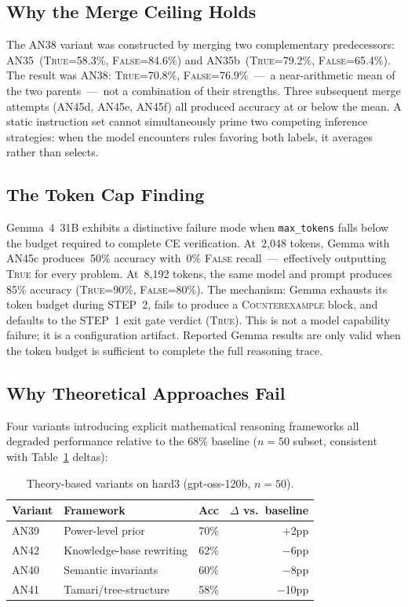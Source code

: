\documentclass[11pt]{article}
\begin{document}
\subsection{Why the Merge Ceiling Holds}

The AN38 variant was constructed by merging two complementary
predecessors: AN35~(\textsc{True}=58.3\%, \textsc{False}=84.6\%) and
AN35b~(\textsc{True}=79.2\%, \textsc{False}=65.4\%). The result was
AN38: \textsc{True}=70.8\%, \textsc{False}=76.9\%~---~a near-arithmetic
mean of the two parents~---~not a combination of their strengths. Three
subsequent merge attempts (AN45d, AN45e, AN45f) all produced accuracy
at or below the mean. A static instruction set cannot simultaneously
prime two competing inference strategies: when the model encounters
rules favoring both labels, it averages rather than selects.

\subsection{The Token Cap Finding}

Gemma~4~31B exhibits a distinctive failure mode when \texttt{max\_tokens}
falls below the budget required to complete CE verification. At~2{,}048
tokens, Gemma with AN45c produces~50\% accuracy with~0\%
\textsc{False} recall~---~effectively outputting \textsc{True} for
every problem. At~8{,}192 tokens, the same model and prompt produces
85\% accuracy (\textsc{True}=90\%, \textsc{False}=80\%). The mechanism:
Gemma exhausts its token budget during STEP~2, fails to produce a
\textsc{Counterexample} block, and defaults to the STEP~1 exit gate
verdict (\textsc{True}). This is not a model capability failure; it is
a configuration artifact. Reported Gemma results are only valid when
the token budget is sufficient to complete the full reasoning trace.

\subsection{Why Theoretical Approaches Fail}

Four variants introducing explicit mathematical reasoning frameworks all
degraded performance relative to the 68\% baseline ($n=50$ subset,
consistent with Table~\ref{tab:theory} deltas):

\begin{table}[h]
\centering
\caption{Theory-based variants on hard3 (gpt-oss-120b, $n=50$).}
\label{tab:theory}
\begin{tabular}{llrr}
\toprule
Variant & Framework & Acc & $\Delta$ vs.\ baseline \\
\midrule
AN39 & Power-level prior       & 70\% & $+$2pp \\
AN42 & Knowledge-base rewriting & 62\% & $-$6pp \\
AN40 & Semantic invariants      & 60\% & $-$8pp \\
AN41 & Tamari/tree-structure    & 58\% & $-$10pp \\
\bottomrule
\end{tabular}
\end{table}
\end{document}
